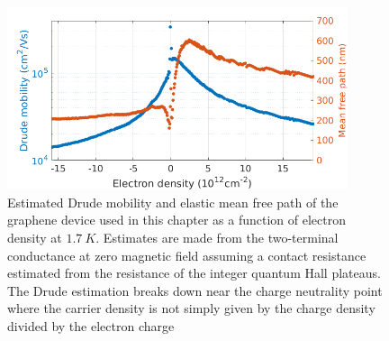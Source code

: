 \begin{figure}
\centering
\includegraphics[width=100mm]{figures/magneto/mobility_mfp_1K.png}
\caption{Estimated Drude mobility and elastic mean free path of the graphene device used in this chapter as a function of electron density at $1.7~K$. Estimates are made from the two-terminal conductance at zero magnetic field assuming a contact resistance estimated from the resistance of the integer quantum Hall plateaus. The Drude estimation breaks down near the charge neutrality point where the carrier density is not simply given by the charge density divided by the electron charge}
\label{fig:m_mobility}
\end{figure}

